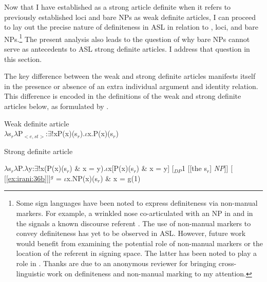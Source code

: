 \documentclass[output=paper,
modfonts
]{langscibook}
\begin{document}
Now that I have established  as a strong article definite when it refers to previously established loci and bare NPs as weak definite articles, I can proceed to lay out the precise nature of definiteness in ASL in relation to , loci, and bare NPs.\footnote{Some sign languages have been noted to express definiteness via non-manual markers. For example, a wrinkled nose co-articulated with an NP in  and in the  signals a known discourse referent \citep{Kimmelman2015}. The use of non-manual markers to convey definiteness has yet to be observed in ASL. However, future work would benefit from examining the potential role of non-manual markers or the location of the referent in signing space. The latter has been noted to play a role in  \citep{Barbera2014}. Thanks are due to an anonymous reviewer for bringing cross-linguistic work on definiteness and non-manual marking to my attention.} The present analysis also leads to the question of why bare NPs cannot serve as antecedents to ASL strong definite articles. I address that question in this section. 

The key difference between the weak and strong definite articles manifests itself in the presence or absence of an extra individual argument and identity relation. This difference is encoded in the definitions of the weak and strong definite articles below, as formulated by \citet{Schwarz2009}.

\begin{exe} 
\ex Weak definite article\\ 
\(\lambda\)s$_r$\(\lambda\)P$_{<e,st>}$:\(\exists\)!xP(x)(s$_r$).\(\iota\)x.P(x)(s$_r$) \citep[148]{Schwarz2009}
\end{exe} 

\begin{exe}
\ex Strong definite article 

\begin{xlist}
	\ex \(\lambda\)s$_r$\(\lambda\)P.\(\lambda\)y:\(\exists\)!x(P(x)(s$_r$) \& x = y).\(\iota\)x[P(x)(s$_r$) \& x = y]
	\ex \label{ex:irani:36b} {[}$_{DP}$1 [[the s$_r$] \emph{NP}]{]}
	\ex ${[}$[\ref{ex:irani:36b}]${]}$$^{g}$ = \(\iota\)x.NP(x)(s$_r$) \& x = g(1) \citep[260]{Schwarz2009}
\end{xlist}

\end{exe}
\end{document}
